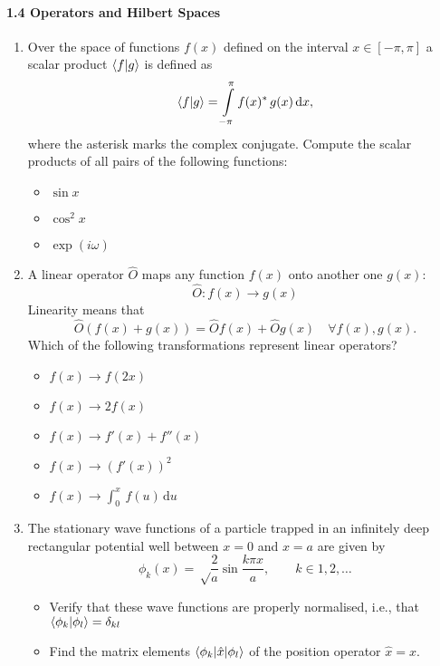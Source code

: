 \documentclass{chem6155problemset}
\begin{document}
\paragraph{1.4 Operators and Hilbert Spaces}
\begin{enumerate}[resume]
	\item Over the space of functions $f(x)$ defined on the interval $x\in [-\pi,\pi]$ a scalar
	product $\langle {f} | {g}\rangle$ is defined as 
	\[ \langle {f} | {g}\rangle = \int\limits_{-\pi}^{\pi} f(x)^\ast \,g(x)\,\mathrm{d}x, \]
	where the asterisk marks the complex conjugate. 
	Compute the scalar products of all pairs of the following functions:
	
	\begin{itemize}
		\item $\sin x$
		\item $\cos^2 x$
		\item $\exp(i \omega )$
		
	\end{itemize}
	
	\item A linear operator $\hat O$ maps any function $f(x)$ onto another one $g(x)$:
	\[ \hat O : f(x)\longrightarrow g(x) \]
	Linearity means that
	\[ \hat O (f(x)+g(x)) = \hat O f(x) + \hat O g(x) \quad \forall f(x),g(x). \]
	Which of the following transformations represent linear operators? 
	\begin{itemize}
	  \item $f(x) \longrightarrow f(2x) $
	  \item $f(x) \longrightarrow 2f(x) $
	  \item $f(x) \longrightarrow f'(x) + f''(x)$
	  \item $f(x) \longrightarrow (f'(x))^2 $
	  \item $f(x) \longrightarrow \int_0^x\,f(u)\,\mathrm{d}u $
	\end{itemize}
	
	
	\item The stationary wave functions of a particle trapped in an infinitely deep rectangular potential
	well between $x=0$ and $x=a$ are given by
	\[ \phi_k(x) = \sqrt\frac{2}{a} \sin \frac{k \pi x}{a},\qquad k\in 1,2,\dots\]
	\begin{itemize}
		\item Verify that these wave functions are properly normalised, i.e., that $\langle {\phi_k} | {\phi_l}\rangle = \delta_{kl}$
		
		\item Find the matrix  elements $\langle{\phi_k}|\hat x|{\phi_l}\rangle$ of the position operator $\hat{x} = x$.
		
		\end{itemize}

\end{enumerate}
\end{document}
